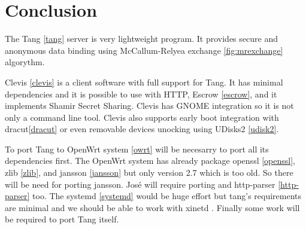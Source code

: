 \documentclass[../xdudla00-porting-Tang-to-Open-WRT.tex]{subfiles}
\begin{document}
\chapter{Conclusion}\label{conlusion}

The Tang \ref{tang} server is very lightweight program.
It provides secure and anonymous data binding using McCallum-Relyea exchange \ref{fig:mrexchange} algorythm.

Clevis \ref{clevis} is a client software with full support for Tang.
It has minimal dependencies and it is possible to use with HTTP, Escrow \ref{escrow}, and it implements Shamir Secret Sharing\cite{sss}.
Clevis has GNOME \cite{gnome} integration so it is not only a command line tool.
Clevis also supports early boot integration with dracut\ref{dracut} or even removable devices unocking using UDisks2 \ref{udisk2}.

To port Tang to OpenWrt system \ref{owrt} will be necesarry to port all its dependencies first.
The OpenWrt system has already package openssl \ref{openssl}, zlib \ref{zlib}, and jansson \ref{jansson} but only version 2.7 which is too old.
So there will be need for porting jansson. José will require porting and http-parser \ref{http-parser} too.
The systemd \ref{systemd} would be huge effort but tang's requirements are minimal and we should be able to
work with xinetd \cite{xinetd}. Finally some work will be required to port Tang itself.
\end{document}
